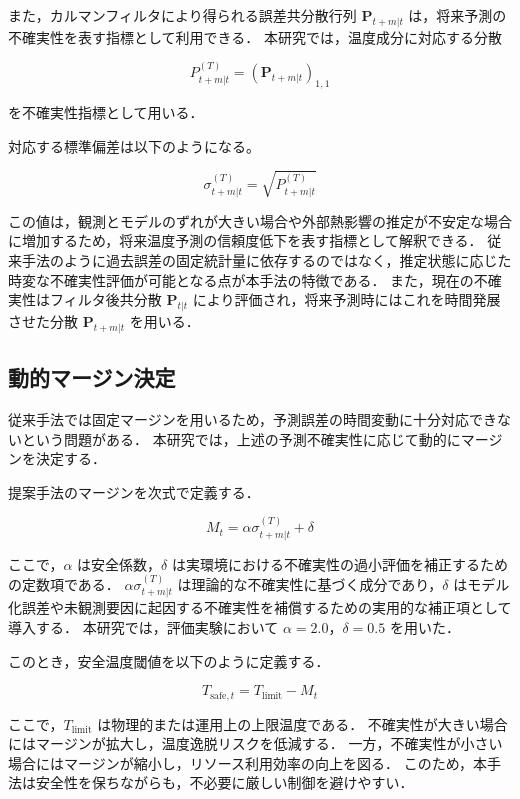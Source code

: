 \documentclass[techrep]{ipsj}
\begin{document}
また，カルマンフィルタにより得られる誤差共分散行列 $\mathbf{P}_{t+m|t}$ は，将来予測の不確実性を表す指標として利用できる．
本研究では，温度成分に対応する分散

\begin{equation}
P_{t+m|t}^{(T)}
=
(\mathbf{P}_{t+m|t})_{1,1}
\end{equation}

を不確実性指標として用いる．

対応する標準偏差は以下のようになる。

\begin{equation}
\sigma_{t+m|t}^{(T)}
=
\sqrt{P_{t+m|t}^{(T)}}
\end{equation}


この値は，観測とモデルのずれが大きい場合や外部熱影響の推定が不安定な場合に増加するため，将来温度予測の信頼度低下を表す指標として解釈できる．
従来手法のように過去誤差の固定統計量に依存するのではなく，推定状態に応じた時変な不確実性評価が可能となる点が本手法の特徴である．
また，現在の不確実性はフィルタ後共分散 $\mathbf{P}_{t|t}$ により評価され，将来予測時にはこれを時間発展させた分散 $\mathbf{P}_{t+m|t}$ を用いる．

\subsection{動的マージン決定}

従来手法では固定マージンを用いるため，予測誤差の時間変動に十分対応できないという問題がある．
本研究では，上述の予測不確実性に応じて動的にマージンを決定する．

提案手法のマージンを次式で定義する．

\begin{equation}
M_t
=
\alpha \sigma_{t+m|t}^{(T)} + \delta
\end{equation}

ここで，$\alpha$ は安全係数，$\delta$ は実環境における不確実性の過小評価を補正するための定数項である．
$\alpha \sigma_{t+m|t}^{(T)}$ は理論的な不確実性に基づく成分であり，$\delta$ はモデル化誤差や未観測要因に起因する不確実性を補償するための実用的な補正項として導入する．
本研究では，評価実験において $\alpha=2.0$，$\delta=0.5$ を用いた．

このとき，安全温度閾値を以下のように定義する．

\begin{equation}
T_{\mathrm{safe},t}
=
T_{\mathrm{limit}} - M_t
\end{equation}

ここで，$T_{\mathrm{limit}}$ は物理的または運用上の上限温度である．
不確実性が大きい場合にはマージンが拡大し，温度逸脱リスクを低減する．
一方，不確実性が小さい場合にはマージンが縮小し，リソース利用効率の向上を図る．
このため，本手法は安全性を保ちながらも，不必要に厳しい制御を避けやすい．
\end{document}
